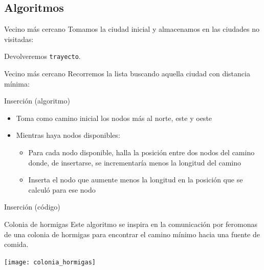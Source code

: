 \subsection{Algoritmos}

\begin{frame}[fragile]{Vecino más cercano}
Tomamos la ciudad inicial y almacenamos en las ciudades no visitadas:

Devolveremos \texttt{trayecto}.
\end{frame}

\begin{frame}[fragile]{Vecino más cercano}
\vspace*{-.5cm}
Recorremos la lista buscando aquella ciudad con distancia mínima:

\end{frame}

\begin{frame}{Inserción (algoritmo)}
  \begin{itemize}
    \item Toma como camino inicial los nodos más al norte, este y oeste
    \item Mientras haya nodos disponibles:
    \begin{itemize}
	    \item Para cada nodo disponible, halla la posición entre dos nodos del camino donde, de insertarse, se incrementaría menos la longitud del camino
	    \item Inserta el nodo que aumente menos la longitud en la posición que se calculó para ese nodo
    \end{itemize}
  \end{itemize}
\end{frame}

\begin{frame}[fragile]{Inserción (código)}
\vspace*{-.5cm}

\end{frame}

\begin{frame}{Colonia de hormigas}
Este algoritmo se inspira en la comunicación por feromonas
de una colonia de hormigas para encontrar el camino mínimo hacia una fuente de comida.

\begin{center}
\texttt{[image: colonia\_hormigas]}
\end{center}

\end{frame}

